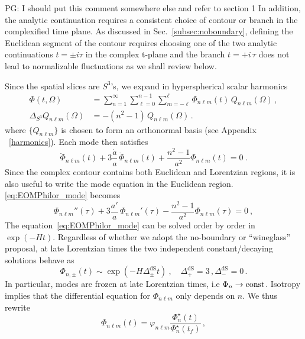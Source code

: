 \documentclass[a4paper,11pt]{article}
\newcommand{\purple}[1]{{\color{purple} #1 \color{black}}}
\newcommand{\PG}[1]{{\purple{PG: #1}}} %
\begin{document}
\PG{I should put this comment somewhere else and refer to section 1}
In addition, the analytic continuation requires a consistent choice of contour or branch in the complexified time plane. As discussed in Sec.~\ref{subsec:noboundary}, defining the Euclidean segment of the contour requires choosing one of the two analytic continuations $t=\pm i\tau$ in the complex t-plane and the branch $t = +i\,\tau$ does not lead to normalizable fluctuations as we shall review below.

Since the spatial slices are $S^3$'s, we expand in hyperspherical scalar harmonics
\begin{equation}\label{eq:scalarharmonics}
\begin{aligned}
\Phi(t,\Omega)&=\sum_{n=1}^{\infty}\sum_{\ell=0}^{n-1}\sum_{m=-\ell}^{\ell}\Phi_{n \ell m}(t)\,Q_{n \ell m}(\Omega)\,,\\
\Delta_{S^3} Q_{n \ell m}(\Omega)&=-(n^2-1)\,Q_{n \ell m}(\Omega)\,.
\end{aligned}
\end{equation}
where $\{Q_{n \ell m}\}$  is chosen to form an orthonormal basis (see Appendix ~\ref{harmonics}). Each mode then satisfies
\begin{equation}\label{eq:EOMPhilor_mode}         
\ddot{\Phi}_{n \ell m}(t)+3\frac{\dot{a}}{a}\,\dot{\Phi}_{n \ell m}(t)
  +\frac{n^2-1}{a^2}\Phi_{n \ell m}(t)=0~.
\end{equation}
Since the complex contour contains both Euclidean and Lorentzian regions, it is also useful to write the mode equation in the Euclidean region. \eqref{eq:EOMPhilor_mode} becomes
\begin{equation}\label{eq:EOMPhieuc_mode}
  \Phi_{n \ell m}''(\tau)+3\frac{a'}{a}\,\Phi_{n \ell m}'(\tau)
  -\frac{n^2-1}{a^2}\Phi_{n \ell m}(\tau)=0~,
\end{equation}
The equation~\eqref{eq:EOMPhilor_mode} can be solved order by order in $\exp(-Ht)$. Regardless of whether we adopt the no-boundary or ``wineglass'' proposal, at late Lorentzian times the two independent constant/decaying solutions behave as
\begin{equation}\label{eq:leadingbehavior}
    \Phi_{n,\pm}(t) \sim \exp(-H\Delta_{\pm}^{\text{dS}}t)~, \quad \Delta_{+}^{\text{dS}}=3\,,\Delta_{-}^{\text{dS}} = 0 \,.
\end{equation}
In particular, modes are frozen at late Lorentzian times, i.e $\Phi_n\to \rm{const}$. Isotropy implies that the differential equation for $\Phi_{n \ell m}$ only depends on $n$. We thus rewrite
\begin{equation}
    \Phi_{n \ell m}(t) = \varphi_{n \ell m} \frac{\Phi^{\star}_{n}(t)}{\Phi_{n}^\star(t_f)}\,,
\end{equation}
\end{document}
